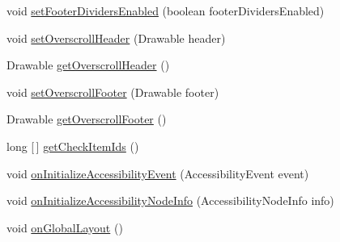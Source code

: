 \begin{DoxyCompactItemize}
\item 
void \hyperlink{classit_1_1sephiroth_1_1android_1_1library_1_1widget_1_1_h_list_view_a782ba3ad87997849ec74ee634070c06c}{set\+Footer\+Dividers\+Enabled} (boolean footer\+Dividers\+Enabled)
\item 
void \hyperlink{classit_1_1sephiroth_1_1android_1_1library_1_1widget_1_1_h_list_view_af637ad0095b9413b784aaf8a3e32ba07}{set\+Overscroll\+Header} (Drawable header)
\item 
Drawable \hyperlink{classit_1_1sephiroth_1_1android_1_1library_1_1widget_1_1_h_list_view_afd364c3f674de1b76b2fe39ee0f6d466}{get\+Overscroll\+Header} ()
\item 
void \hyperlink{classit_1_1sephiroth_1_1android_1_1library_1_1widget_1_1_h_list_view_a7399b7a0121638d622240282c8d5a713}{set\+Overscroll\+Footer} (Drawable footer)
\item 
Drawable \hyperlink{classit_1_1sephiroth_1_1android_1_1library_1_1widget_1_1_h_list_view_addad340f6ed89e3d24b41819efb40fa6}{get\+Overscroll\+Footer} ()
\item 
long \mbox{[}$\,$\mbox{]} \hyperlink{classit_1_1sephiroth_1_1android_1_1library_1_1widget_1_1_h_list_view_ad7b4d7aa2500eeea7ade9fcd1e6c31e7}{get\+Check\+Item\+Ids} ()
\item 
void \hyperlink{classit_1_1sephiroth_1_1android_1_1library_1_1widget_1_1_h_list_view_a085258b30abccbe0502f9a31e39fb579}{on\+Initialize\+Accessibility\+Event} (Accessibility\+Event event)
\item 
void \hyperlink{classit_1_1sephiroth_1_1android_1_1library_1_1widget_1_1_h_list_view_ac1d867f1b8cd2032977190dd1311794d}{on\+Initialize\+Accessibility\+Node\+Info} (Accessibility\+Node\+Info info)
\item 
void \hyperlink{classit_1_1sephiroth_1_1android_1_1library_1_1widget_1_1_h_list_view_a5071d82396baaf4968439ec4354020ff}{on\+Global\+Layout} ()
\end{DoxyCompactItemize}
